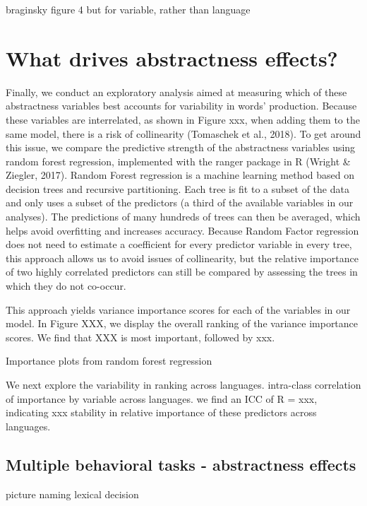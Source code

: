 \documentclass[
  man,floatsintext]{apa6}
\begin{document}
braginsky figure 4 but for variable, rather than language

\section{What drives abstractness effects?}\label{what-drives-abstractness-effects}

Finally, we conduct an exploratory analysis aimed at measuring which of these abstractness variables best accounts for variability in words' production. Because these variables are interrelated, as shown in Figure xxx, when adding them to the same model, there is a risk of collinearity (Tomaschek et al., 2018). To get around this issue, we compare the predictive strength of the abstractness variables using random forest regression, implemented with the ranger package in R (Wright \& Ziegler, 2017). Random Forest regression is a machine learning method based on decision trees and recursive partitioning. Each tree is fit to a subset of the data and only uses a subset of the predictors (a third of the available variables in our analyses). The predictions of many hundreds of trees can then be averaged, which helps avoid overfitting and increases accuracy. Because Random Factor regression does not need to estimate a coefficient for every predictor variable in every tree, this approach allows us to avoid issues of collinearity, but the relative importance of two highly correlated predictors can still be compared by assessing the trees in which they do not co-occur.

This approach yields variance importance scores for each of the variables in our model. In Figure XXX, we display the overall ranking of the variance importance scores. We find that XXX is most important, followed by xxx.

Importance plots from random forest regression

We next explore the variability in ranking across languages. intra-class correlation of importance by variable across languages. we find an ICC of R = xxx, indicating xxx stability in relative importance of these predictors across languages.

\subsection{Multiple behavioral tasks - abstractness effects}\label{multiple-behavioral-tasks---abstractness-effects}

picture naming lexical decision
\end{document}
